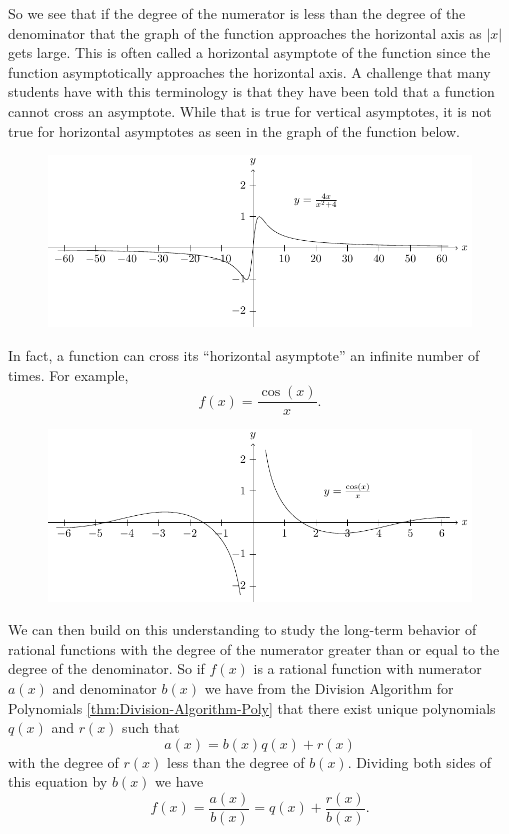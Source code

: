\documentclass[
]{book}
\theoremstyle{definition}
\theoremstyle{definition}
\theoremstyle{definition}
\theoremstyle{definition}
\theoremstyle{remark}
\begin{document}
So we see that if the degree of the numerator is less than the degree of the denominator that the graph of the function approaches the horizontal axis as \(|x|\) gets large. This is often called a horizontal asymptote of the function since the function asymptotically approaches the horizontal axis. A challenge that many students have with this terminology is that they have been told that a function cannot cross an asymptote. While that is true for vertical asymptotes, it is not true for horizontal asymptotes as seen in the graph of the function below.

\begin{figure}

{\centering \includegraphics[width=0.5\linewidth]{tikz/rational3} 

}

\end{figure}

In fact, a function can cross its ``horizontal asymptote'' an infinite number of times. For example,
\[f(x)=\frac{\cos(x)}{x}.\]

\begin{figure}

{\centering \includegraphics[width=0.5\linewidth]{tikz/rational4} 

}

\end{figure}

We can then build on this understanding to study the long-term behavior of rational functions with the degree of the numerator greater than or equal to the degree of the denominator.
So if \(f(x)\) is a rational function with numerator \(a(x)\) and denominator \(b(x)\) we have from the Division Algorithm for Polynomials \ref{thm:Division-Algorithm-Poly} that there exist unique polynomials \(q(x)\) and \(r(x)\) such that
\[a(x)=b(x) q(x) + r(x)\] with the degree of \(r(x)\) less than the degree of \(b(x)\). Dividing both sides of this equation by \(b(x)\) we have
\[f(x)=\frac{a(x)}{b(x)} = q(x) + \frac{r(x)}{b(x)}.\]
\end{document}
